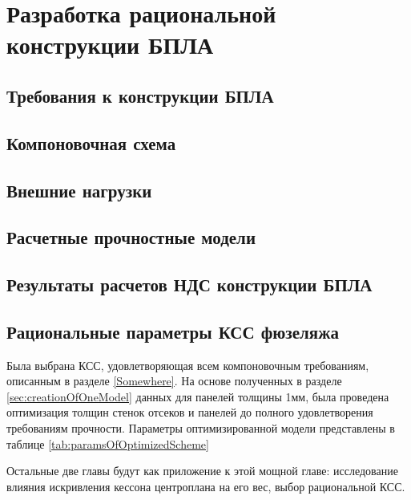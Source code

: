 \chapter{Разработка рациональной конструкции БПЛА}

\section{Требования к конструкции БПЛА}



\section{Компоновочная схема}
	

\section{Внешние нагрузки}
\label{sec:externalLoads}



\section{Расчетные прочностные модели}




\section{Результаты расчетов НДС конструкции БПЛА} 


\section{Рациональные параметры КСС фюзеляжа}
Была выбрана КСС, удовлетворяющая всем компоновочным требованиям, описанным в разделе \ref{Somewhere}. 
На основе полученных в разделе \ref{sec:creationOfOneModel} данных для панелей толщины 1мм, была проведена оптимизация толщин стенок отсеков и панелей до полного удовлетворения требованиям прочности. Параметры оптимизированной модели представлены в таблице \ref{tab:paramsOfOptimizedScheme}

Остальные две главы будут как приложение к этой мощной главе: исследование влияния искривления кессона центроплана на его вес, выбор рациональной КСС.